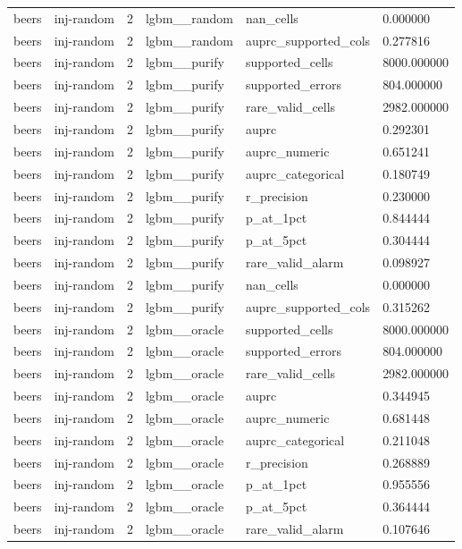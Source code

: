 \begin{tabular}{llllll}
beers & inj-random & 2 & lgbm\_\_random & nan\_cells & 0.000000 \\
beers & inj-random & 2 & lgbm\_\_random & auprc\_supported\_cols & 0.277816 \\
beers & inj-random & 2 & lgbm\_\_purify & supported\_cells & 8000.000000 \\
beers & inj-random & 2 & lgbm\_\_purify & supported\_errors & 804.000000 \\
beers & inj-random & 2 & lgbm\_\_purify & rare\_valid\_cells & 2982.000000 \\
beers & inj-random & 2 & lgbm\_\_purify & auprc & 0.292301 \\
beers & inj-random & 2 & lgbm\_\_purify & auprc\_numeric & 0.651241 \\
beers & inj-random & 2 & lgbm\_\_purify & auprc\_categorical & 0.180749 \\
beers & inj-random & 2 & lgbm\_\_purify & r\_precision & 0.230000 \\
beers & inj-random & 2 & lgbm\_\_purify & p\_at\_1pct & 0.844444 \\
beers & inj-random & 2 & lgbm\_\_purify & p\_at\_5pct & 0.304444 \\
beers & inj-random & 2 & lgbm\_\_purify & rare\_valid\_alarm & 0.098927 \\
beers & inj-random & 2 & lgbm\_\_purify & nan\_cells & 0.000000 \\
beers & inj-random & 2 & lgbm\_\_purify & auprc\_supported\_cols & 0.315262 \\
beers & inj-random & 2 & lgbm\_\_oracle & supported\_cells & 8000.000000 \\
beers & inj-random & 2 & lgbm\_\_oracle & supported\_errors & 804.000000 \\
beers & inj-random & 2 & lgbm\_\_oracle & rare\_valid\_cells & 2982.000000 \\
beers & inj-random & 2 & lgbm\_\_oracle & auprc & 0.344945 \\
beers & inj-random & 2 & lgbm\_\_oracle & auprc\_numeric & 0.681448 \\
beers & inj-random & 2 & lgbm\_\_oracle & auprc\_categorical & 0.211048 \\
beers & inj-random & 2 & lgbm\_\_oracle & r\_precision & 0.268889 \\
beers & inj-random & 2 & lgbm\_\_oracle & p\_at\_1pct & 0.955556 \\
beers & inj-random & 2 & lgbm\_\_oracle & p\_at\_5pct & 0.364444 \\
beers & inj-random & 2 & lgbm\_\_oracle & rare\_valid\_alarm & 0.107646 \\

\end{tabular}
